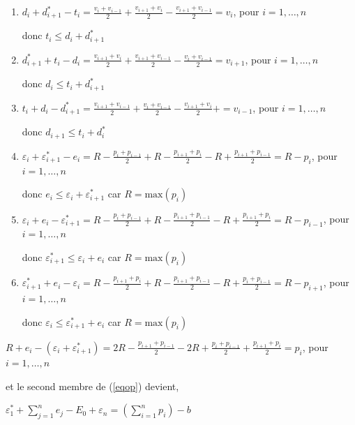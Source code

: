 \begin{enumerate}
\item $
d_{i}+d_{i+1}^*-t_i=  \frac{v_{i}+v_{i-1}}{2}   + 
\frac{v_{i+1}+v_{i}}{2}   - 
\frac{v_{i+1}+v_{i-1}}{2} =v_i$, pour $i=1, \dots,  n$

donc $t_i \leq d_{i}+d_{i+1}^*$


\item $
d_{i+1}^*+t_i-d_{i}=  \frac{v_{i+1}+v_{i}}{2}   + 
\frac{v_{i+1}+v_{i-1}}{2} -\frac{v_{i}+v_{i-1}}{2}   =v_{i+1}$, pour $i=1, \dots,  n$

donc $d_{i} \leq t_i+d_{i+1}^*$


\item $
t_i+d_{i}-d_{i+1}^*=  \frac{v_{i+1}+v_{i-1}}{2} +
\frac{v_{i}+v_{i-1}}{2}  -\frac{v_{i+1}+v_{i}}{2}   +  =v_{i-1}$, pour $i=1, \dots,  n$

donc $d_{i+1} \leq t_i+d_{i}^*$

\item $
\varepsilon_{i}+\varepsilon_{i+1}^*-e_i=R- \frac{p_{i}+p_{i-1}}{2} +  R- 
\frac{p_{i+1}+p_{i}}{2}   - R+
\frac{p_{i+1}+p_{i-1}}{2} =R-p_i$, pour $i=1, \dots,  n$

donc $e_i \leq \varepsilon_{i}+\varepsilon_{i+1}^*$ car $R = \textrm{max}(p_i) $


\item $
\varepsilon_{i}+e_i-\varepsilon_{i+1}^*=R- \frac{p_{i}+p_{i-1}}{2} +  R-
\frac{p_{i+1}+p_{i-1}}{2} - R+ 
\frac{p_{i+1}+p_{i}}{2}  =R-p_{i-1}$, pour $i=1, \dots,  n$

donc $\varepsilon_{i+1}^* \leq \varepsilon_{i}+e_i$ car $R = \textrm{max}(p_i) $


\item $
\varepsilon_{i+1}^*+e_i-\varepsilon_{i}=  R- \frac{p_{i+1}+p_{i}}{2}   + R-
\frac{p_{i+1}+p_{i-1}}{2}- R+ \frac{p_{i}+p_{i-1}}{2}  =R-p_{i+1}$, pour $i=1, \dots,  n$

donc $\varepsilon_{i} \leq \varepsilon_{i+1}^*+e_i$ car $R = \textrm{max}(p_i) $



\end{enumerate}

$R+e_i-(\varepsilon_{i}+\varepsilon_{i+1}^*)=2R- \frac{p_{i+1}+p_{i-1}}{2}   - 2R+ \frac{p_{i}+p_{i-1}}{2}  + \frac{p_{i+1}+p_{i}}{2} =p_i$, pour $i=1, \dots,  n$

et le second membre de (\ref{eqop}) devient,



$ \varepsilon_{1}^*+ \sum_{j=1}^{n}e_j -E_0 +\varepsilon_{n} =(\sum_{i=1}^{n}p_i)-b $

